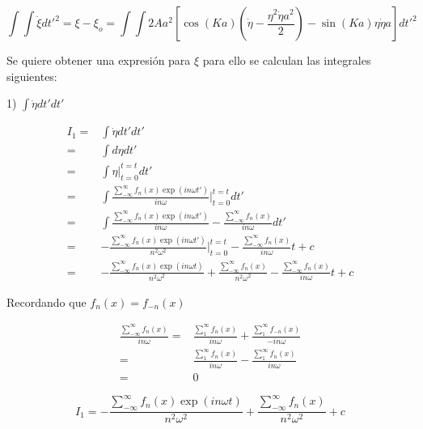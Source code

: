     \begin{equation}\label{eq:B.11}
        \int\int \ddot{\xi}dt'^2=\xi-\xi_o= \int \int 2Aa^2[\cos(Ka)(\dot{\eta}-\frac{\eta^2\dot{\eta}a^2}{2})-\sin(Ka)\eta\dot{\eta} a ]dt'^2
    \end{equation}

Se quiere obtener una expresión para $\xi$ para ello se calculan las integrales siguientes:


1) $\int \dot{\eta} dt' dt'$

    \begin{equation}\label{eq:B.12}
        \begin{split}
            I_1=&\int \dot{\eta} dt' dt'\\
            =&\int d\eta dt' \\
            =& \int \eta |^{t=t}_{t=0} dt'\\
            =& \int \frac{\sum_{-\infty}^{\infty} f_n(x)\exp(i n\omega t')}{in\omega}|^{t=t}_{t=0} dt'\\
            =&\int \frac{\sum_{-\infty}^{\infty} f_n(x)\exp(i n\omega t')}{in\omega}-\frac{\sum_{-\infty}^{\infty} f_n(x)}{in\omega} dt'\\
            =& -\frac{\sum_{-\infty}^{\infty} f_n(x)\exp(i n\omega t')}{n^2\omega^2}|^{t=t}_{t=0}-\frac{\sum_{-\infty}^{\infty} f_n(x)}{in\omega}t+c\\
            =& -\frac{\sum_{-\infty}^{\infty} f_n(x)\exp(i n\omega t)}{n^2\omega^2}+\frac{\sum_{-\infty}^{\infty} f_n(x)}{n^2\omega^2}-\frac{\sum_{-\infty}^{\infty} f_n(x)}{in\omega}t+c
        \end{split} 
    \end{equation}

Recordando que $f_n(x)=f_{-n}(x)$ 

    \begin{equation}\label{eq:B.13}
        \begin{split}
            \frac{\sum_{-\infty}^{\infty} f_n(x)}{in\omega}=&\frac{\sum_{1}^{\infty} f_n(x)}{in\omega}+\frac{\sum_{1}^{\infty} f_{-n}(x)}{-in\omega}\\
            =&\frac{\sum_{1}^{\infty} f_n(x)}{in\omega}-\frac{\sum_{1}^{\infty} f_{n}(x)}{in\omega}\\
            =&0
        \end{split}
    \end{equation}

    \begin{equation}\label{eq:B.14}
            I_1=-\frac{\sum_{-\infty}^{\infty} f_n(x)\exp(i n\omega t)}{n^2\omega^2}+\frac{\sum_{-\infty}^{\infty} f_n(x)}{n^2\omega^2}+c
    \end{equation}

